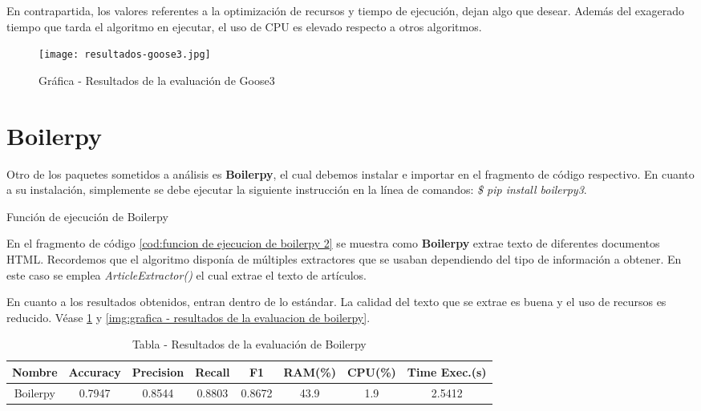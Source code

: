 En contrapartida, los valores referentes a la optimización de recursos y tiempo de ejecución, dejan algo
que desear. Además del exagerado tiempo que tarda el algoritmo en ejecutar, el uso de CPU es elevado
respecto a otros algoritmos.

\begin{figure}[tphb]
    \centering
    \texttt{[image: resultados-goose3.jpg]}
    \caption{Gráfica - Resultados de la evaluación de Goose3}
    \label{img:grafica - resultados de la evaluacion de goose3}
\end{figure}

\section*{Boilerpy}

Otro de los paquetes sometidos a análisis es \textbf{Boilerpy}, el cual debemos instalar e importar en el 
fragmento de código respectivo. En cuanto a su instalación, simplemente se debe ejecutar la siguiente 
instrucción en la línea de comandos: \emph{\$ pip install boilerpy3}.

\begin{codefloat}
    
    \caption{Función de ejecución de Boilerpy}
    \label{cod:funcion de ejecucion de boilerpy 2}
\end{codefloat}

En el fragmento de código \ref{cod:funcion de ejecucion de boilerpy 2} se muestra como \textbf{Boilerpy}
extrae texto de diferentes documentos HTML. Recordemos que el algoritmo disponía de múltiples extractores
que se usaban dependiendo del tipo de información a obtener. En este caso se emplea \emph{ArticleExtractor()}
el cual extrae el texto de artículos.

En cuanto a los resultados obtenidos, entran dentro de lo estándar. La calidad del texto que se extrae es
buena y el uso de recursos es reducido. Véase \ref{tab:tabla - resultados de la evaluacion de boilerpy} y 
\ref{img:grafica - resultados de la evaluacion de boilerpy}.

\begin{table}[h]
    \begin{center}
      \begin{tabular}{| c | c | c | c | c | c | c | c |} \hline 
       \textbf{Nombre} & \textbf{Accuracy} & \textbf{Precision}  & \textbf{Recall} & \textbf{F1} & \textbf{RAM(\%)} & \textbf{CPU(\%)} & \textbf{Time Exec.(s)} \\ \hline
       Boilerpy & 0.7947 & 0.8544 & 0.8803 & 0.8672 & 43.9 & 1.9 & 2.5412 \\ \hline
      \end{tabular}
      \caption{Tabla - Resultados de la evaluación de Boilerpy}
      \label{tab:tabla - resultados de la evaluacion de boilerpy}
    \end{center}
\end{table}

